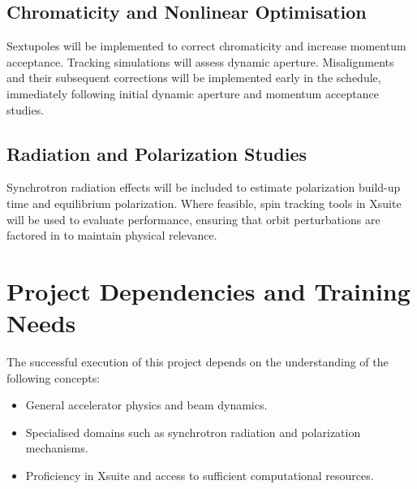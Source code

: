 \documentclass[aip,twocolumn,10pt,graphicx]{revtex4-1}
\begin{document}
\subsection{Chromaticity and Nonlinear Optimisation}

Sextupoles will be implemented to correct chromaticity and increase momentum acceptance. Tracking simulations will assess dynamic aperture. Misalignments and their subsequent corrections will be implemented early in the schedule, immediately following initial dynamic aperture and momentum acceptance studies.
\subsection{Radiation and Polarization Studies}

Synchrotron radiation effects will be included to estimate polarization build-up time and equilibrium polarization. Where feasible, spin tracking tools in Xsuite will be used to evaluate performance, ensuring that orbit perturbations are factored in to maintain physical relevance.

\section{Project Dependencies and Training Needs}
The successful execution of this project depends on the understanding of the following concepts:
\begin{itemize}
\item General accelerator physics and beam dynamics.
\item Specialised domains such as synchrotron radiation and polarization mechanisms.
\item Proficiency in Xsuite and access to sufficient computational resources.
\end{itemize}
\end{document}

